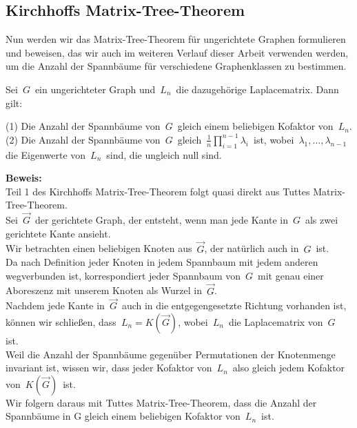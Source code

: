 \subsection{Kirchhoffs Matrix-Tree-Theorem}
Nun werden wir das Matrix-Tree-Theorem für ungerichtete Graphen formulieren und beweisen, das wir auch im weiteren Verlauf dieser Arbeit verwenden werden, um die Anzahl der Spannbäume für verschiedene Graphenklassen zu bestimmen.
\begin{Tms}
Sei $\,G\,$ ein ungerichteter Graph und $\,L_n\,$  die dazugehörige Laplacematrix. 
Dann gilt:
\par
\begingroup
\leftskip=20pt%
\rightskip=20pt
\noindent %
(1) Die Anzahl der Spannbäume von $\,G\,$ gleich einem beliebigen Kofaktor von $\,L_n$.\; \\
(2) Die Anzahl der Spannbäume von $\,G\,$ gleich $\,\frac{1}{n}\prod_{i=1}^{n-1}\lambda_i\,$ ist, wobei $\,\lambda_1,\ldots,\lambda_{n-1}\,$ die Eigenwerte von $\,L_n\,$ sind, die ungleich null sind.
\par
\endgroup
\end{Tms}
\textbf{Beweis:}\\
Teil 1 des Kirchhoffs Matrix-Tree-Theorem folgt quasi direkt aus Tuttes Matrix-Tree-Theorem. \\
Sei $\,\vec{G}\,$ der gerichtete Graph, der entsteht, wenn man jede Kante in $\,G\,$ als zwei gerichtete Kante ansieht.\\
Wir betrachten einen beliebigen Knoten aus $\,\vec{G}$,\; der natürlich auch in $\,G\,$ ist. \\
Da nach Definition jeder Knoten in jedem Spannbaum mit jedem anderen wegverbunden ist, korrespondiert jeder Spannbaum von $\,G\,$ mit genau einer Aboreszenz mit unserem Knoten als Wurzel in $\,\vec{G}$.\;  \\
Nachdem jede Kante in $\,\vec{G}\,$ auch in die entgegengesetzte Richtung vorhanden ist, können wir schließen, dass $\,L_n=K(\vec{G})$,\; wobei $\,L_n\,$ die Laplacematrix von $\,G\,$ ist. \\
Weil die Anzahl der Spannbäume gegenüber Permutationen der Knotenmenge invariant ist, wissen wir, dass jeder Kofaktor von $\,L_n\,$ also gleich jedem Kofaktor von $\,K(\vec{G})\,$ ist.\\
Wir folgern daraus mit Tuttes Matrix-Tree-Theorem, dass die Anzahl der Spannbäume in G gleich einem beliebigen Kofaktor von $\,L_n\,$ ist.\\ \\
